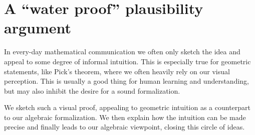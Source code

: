 \documentclass[a4paper]{amsart}
\numberwithin{equation}{section}
\theoremstyle{plain}
\theoremstyle{definition}
\begin{document}
\setcounter{section}{22}
\section{A “water proof” plausibility argument}

In every-day mathematical communication we often only sketch
the idea and appeal to some degree of informal intuition.
This is especially true for geometric statements,
like Pick's theorem, where we often heavily rely on our visual perception.
This is usually a good thing for human learning and understanding,
but may also inhibit the desire for a sound formalization.

We sketch such a visual proof, appealing to geometric intuition
as a counterpart to our algebraic formalization.
We then explain how the intuition can be made precise
and finally leads to our algebraic viewpoint,
closing this circle of ideas.
\end{document}
